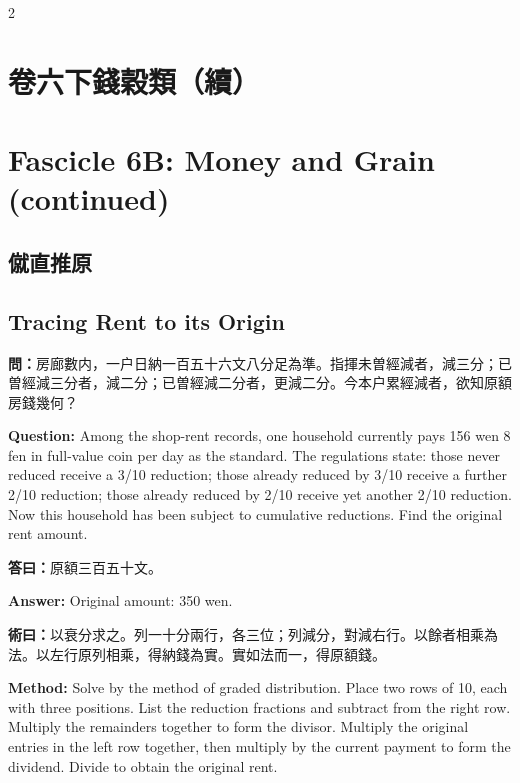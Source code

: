 \documentclass[11pt,a4paper]{article}
\newcommand{\QuestionText}[1]{\par\noindent\textbf{\color{problemcolor}問：}#1\par}
\newcommand{\AnswerText}[1]{\par\noindent\textbf{\color{answercolor}答曰：}#1\par}
\newcommand{\MethodText}[1]{\par\noindent\textbf{\color{methodcolor}術曰：}#1\par}
\newcommand{\QuestionEn}[1]{\par\noindent\textbf{\color{problemcolor}Question:} #1\par}
\newcommand{\AnswerEn}[1]{\par\noindent\textbf{\color{answercolor}Answer:} #1\par}
\newcommand{\MethodEn}[1]{\par\noindent\textbf{\color{methodcolor}Method:} #1\par}
\begin{document}
\begin{paracol}{2}

\section*{\color{titlecolor}卷六下\quad 錢穀類（續）}
\switchcolumn
\section*{\color{titlecolor}Fascicle 6B: Money and Grain (continued)}
\switchcolumn*

\subsection*{\color{sectioncolor}僦直推原}
\switchcolumn
\subsection*{\color{sectioncolor}Tracing Rent to its Origin}
\switchcolumn*

\QuestionText{房廊數内，一户日納一百五十六文八分足為準。指揮未曽經減者，減三分；已曽經減三分者，減二分；已曽經減二分者，更減二分。今本户累經減者，欲知原額房錢幾何？}
\switchcolumn
\QuestionEn{Among the shop-rent records, one household currently pays 156 wen 8 fen in full-value coin per day as the standard. The regulations state: those never reduced receive a 3/10 reduction; those already reduced by 3/10 receive a further 2/10 reduction; those already reduced by 2/10 receive yet another 2/10 reduction. Now this household has been subject to cumulative reductions. Find the original rent amount.}
\switchcolumn*

\AnswerText{原額三百五十文。}
\switchcolumn
\AnswerEn{Original amount: 350 wen.}
\switchcolumn*

\MethodText{以衰分求之。列一十分兩行，各三位；列減分，對減右行。以餘者相乘為法。以左行原列相乘，得納錢為實。實如法而一，得原額錢。}
\switchcolumn
\MethodEn{Solve by the method of graded distribution. Place two rows of 10, each with three positions. List the reduction fractions and subtract from the right row. Multiply the remainders together to form the divisor. Multiply the original entries in the left row together, then multiply by the current payment to form the dividend. Divide to obtain the original rent.}
\switchcolumn*


\end{paracol}
\end{document}
